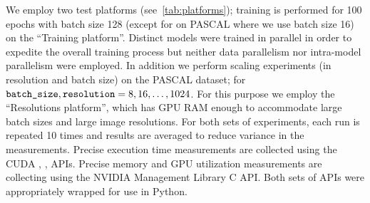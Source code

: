 

We employ two test platforms (see~\cref{tab:platforms});
training is performed for 100 epochs with batch size 128 (except for on PASCAL where we use batch size 16) on the ``Training platform''.
Distinct models were trained in parallel in order to expedite the overall training process but neither data parallelism nor intra-model parallelism were employed.
In addition we perform scaling experiments (in resolution and batch size) on the PASCAL dataset;
for $\texttt{batch\_size}, \texttt{resolution} = 8, 16, \dots, 1024$.
For this purpose we employ the ``Resolutions platform'', which has GPU RAM enough to accommodate large batch sizes and large image resolutions.
For both sets of experiments, each run is repeated 10 times and results are averaged to reduce variance in the measurements.
Precise execution time measurements are collected using the CUDA , ,  APIs.
Precise memory and GPU utilization measurements are collecting using the NVIDIA Management Library C API\@.
Both sets of APIs were appropriately wrapped for use in Python.




